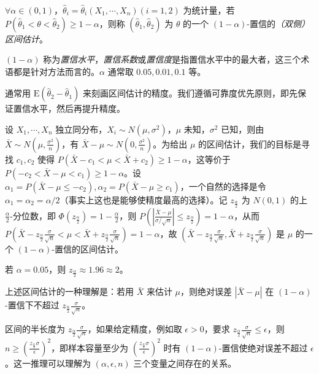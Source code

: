 \documentclass[../main.tex]{subfiles}
\begin{document}
\begin{definition}\label{def:6.4.1}
    $\forall\alpha\in(0,1)$，$\hat\theta_i=\hat\theta_i(X_1,\cdots,X_n)(i=1,2)$ 为统计量，若 $P(\hat\theta_1<\theta<\hat\theta_2)\geq1-\alpha$，则称 $(\hat\theta_1,\hat\theta_2)$ 为 $\theta$ 的一个 $(1-\alpha)$-置信的\emph{（双侧）区间估计}。
\end{definition}

$(1-\alpha)$ 称为\emph{置信水平}，\emph{置信系数}或\emph{置信度}是指置信水平中的最大者，这三个术语都是针对方法而言的。$\alpha$ 通常取 $0.05,0.01,0.1$ 等。

通常用 $\mathrm E(\hat\theta_2-\hat\theta_1)$ 来刻画区间估计的精度。我们遵循可靠度优先原则，即先保证置信水平，然后再提升精度。

\begin{example}
    设 $X_1,\cdots,X_n$ 独立同分布，$X_i\sim N(\mu,\sigma^2)$，$\mu$ 未知，$\sigma^2$ 已知，则由 $\bar X\sim N(\mu,\frac{\sigma^2}n)$，有 $\bar X-\mu\sim N(0,\frac{\sigma^2}n)$。为给出 $\mu$ 的区间估计，我们的目标是寻找 $c_1,c_2$ 使得 $P(\bar X-c_1<\mu<\bar X+c_2)\geq1-\alpha$，这等价于 $P(-c_2<\bar X-\mu<c_1)\geq1-\alpha$。设 $\alpha_1=P(\bar X-\mu\leq-c_2),\alpha_2=P(\bar X-\mu\geq c_1)$，一个自然的选择是令 $\alpha_1=\alpha_2=\alpha/2$（事实上这也是能够使精度最高的选择）。记 $z_{\frac\alpha2}$ 为 $N(0,1)$ 的上 $\frac\alpha2$-分位数，即 $\Phi(z_{\frac\alpha2})=1-\frac\alpha2$，则 $P(\left|\frac{\bar X-\mu}{\sigma/\sqrt n}\right|\leq z_{\frac\alpha2})=1-\alpha$，从而 $P(\bar X-z_{\frac\alpha2}\frac\sigma{\sqrt n}<\mu<\bar X+z_{\frac\alpha2}\frac\sigma{\sqrt n})=1-\alpha$，故 $(\bar X-z_{\frac\alpha2}\frac\sigma{\sqrt n},\bar X+z_{\frac\alpha2}\frac\sigma{\sqrt n})$ 是 $\mu$ 的一个 $(1-\alpha)$-置信的区间估计。
\end{example}

若 $\alpha=0.05$，则 $z_{\frac\alpha2}\approx1.96\approx2$。

上述区间估计的一种理解是：若用 $\bar X$ 来估计 $\mu$，则绝对误差 $|\bar X-\mu|$ 在 $(1-\alpha)$-置信下不超过 $z_{\frac\alpha2}\frac\sigma{\sqrt n}$。

区间的半长度为 $z_{\frac\alpha2}\frac\sigma{\sqrt n}$，如果给定精度，例如取 $\epsilon>0$，要求 $z_{\frac\alpha2}\frac\sigma{\sqrt n}\leq\epsilon$，则 $n\geq(\frac{z_{\frac\alpha2}\sigma}\epsilon)^2$，即样本容量至少为 $(\frac{z_{\frac\alpha2}\sigma}\epsilon)^2$ 时有 $(1-\alpha)$-置信使绝对误差不超过 $\epsilon$。这一推理可以理解为 $(\alpha,\epsilon,n)$ 三个变量之间存在的关系。
\end{document}
